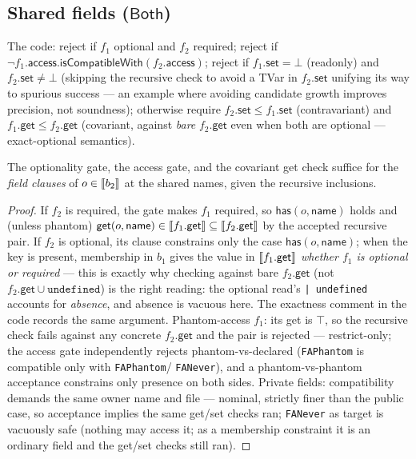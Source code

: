 \documentclass[11pt]{article}
\begin{document}
\subsection{Shared fields ($\mathsf{Both}$)}

The code: reject if $f_1$ optional and $f_2$ required; reject if
$\neg f_1.\mathsf{access}.\mathsf{isCompatibleWith}(f_2.\mathsf{access})$;
reject if $f_1.\mathsf{set} = \bot$ (readonly) and
$f_2.\mathsf{set} \neq \bot$ (skipping the recursive check to avoid a
TVar in $f_2.\mathsf{set}$ unifying its way to spurious success --- an
example where avoiding candidate growth improves precision, not soundness);
otherwise require $f_2.\mathsf{set} \leq f_1.\mathsf{set}$
(contravariant) and $f_1.\mathsf{get} \leq f_2.\mathsf{get}$ (covariant,
against \emph{bare} $f_2.\mathsf{get}$ even when both are optional ---
exact-optional semantics).

\begin{lemma}
\label{lem:both-get}
The optionality gate, the access gate, and the covariant get check
suffice for the \emph{field clauses} of $o \in \llbracket b_2 \rrbracket$ at the shared
names, given the recursive inclusions.
\end{lemma}
\begin{proof}
If $f_2$ is required, the gate makes $f_1$ required, so
$\mathsf{has}(o, \mathsf{name})$ holds and (unless phantom)
$\mathsf{get}(o,\mathsf{name}) \in \llbracket f_1.\mathsf{get} \rrbracket \subseteq
\llbracket f_2.\mathsf{get} \rrbracket$ by the accepted recursive pair. If $f_2$ is
optional, its clause constrains only the case
$\mathsf{has}(o,\mathsf{name})$; when the key is present, membership in
$b_1$ gives the value in $\llbracket f_1.\mathsf{get} \rrbracket$ \emph{whether $f_1$ is
optional or required} --- this is exactly why checking against bare
$f_2.\mathsf{get}$ (not $f_2.\mathsf{get} \cup \texttt{undefined}$) is
the right reading: the optional read's \texttt{| undefined} accounts for
\emph{absence}, and absence is vacuous here. The exactness comment in
the code records the same argument. Phantom-access $f_1$: its get is
$\top$, so the recursive check fails against any concrete
$f_2.\mathsf{get}$ and the pair is rejected --- restrict-only; the access
gate independently rejects phantom-vs-declared
(\texttt{FAPhantom} is compatible only with \texttt{FAPhantom}/%
\texttt{FANever}), and a phantom-vs-phantom acceptance constrains only
presence on both sides. Private fields: compatibility demands the same
owner name and file --- nominal, strictly finer than the public case, so
acceptance implies the same get/set checks ran; \texttt{FANever} as
target is vacuously safe (nothing may access it; as a membership
constraint it is an ordinary field and the get/set checks still ran).
\end{proof}
\end{document}
